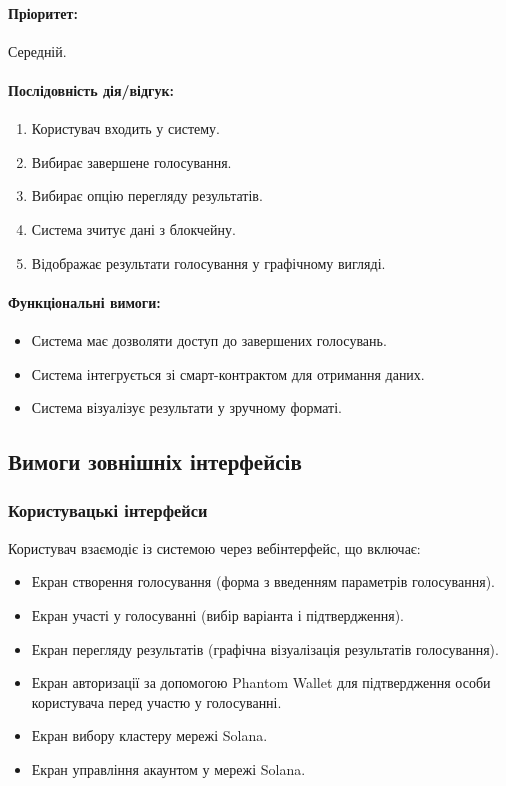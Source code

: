 \documentclass[14pt]{extreport}
\newcounter{req}[subsubsection]
\newcommand\req{\arabic{req}\stepcounter{req}}
\begin{document}
  \paragraph{Пріоритет:} Середній.  
  \paragraph{Послідовність дія/відгук:}  
  \begin{enumerate}  
      \item Користувач входить у систему.  
      \item Вибирає завершене голосування.  
      \item Вибирає опцію перегляду результатів.  
      \item Система зчитує дані з блокчейну.  
      \item Відображає результати голосування у графічному вигляді.  
  \end{enumerate}  
  \paragraph{Функціональні вимоги:}  
  \begin{itemize}[leftmargin=*,label=REQ-.\req:]  
      \item Система має дозволяти доступ до завершених голосувань.  
      \item Система інтегрується зі смарт-контрактом для отримання даних.  
      \item Система візуалізує результати у зручному форматі.
  \end{itemize}  

  \subsection{Вимоги зовнішніх інтерфейсів}
  \subsubsection{Користувацькі інтерфейси}
  Користувач взаємодіє із системою через вебінтерфейс, що включає:
  \begin{itemize}
    \item Екран створення голосування (форма з введенням параметрів голосування).
    \item Екран участі у голосуванні (вибір варіанта і підтвердження).
    \item Екран перегляду результатів (графічна візуалізація результатів голосування).
    \item Екран авторизації за допомогою Phantom Wallet для підтвердження особи користувача перед участю у голосуванні.
    \item Екран вибору кластеру мережі Solana.
    \item Екран управління акаунтом у мережі Solana.
  \end{itemize}
  
\end{document}
